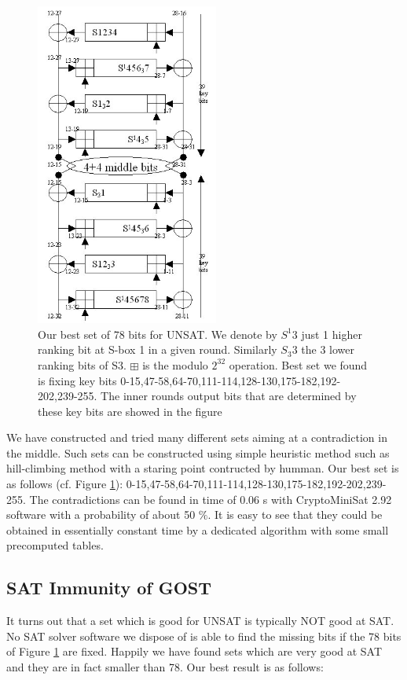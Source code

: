 \begin{figure}[h]
	\centering
	\includegraphics[width=60mm]{./pics/gost81optimal4KP.jpg}
	\caption[Our best set of 78 bits for UNSAT]{Our best set of 78 bits for UNSAT. We denote by $S^{1}3$ just 1 higher ranking bit at S-box 1 in a given round.
		Similarly $S_{3}3$ the 3 lower ranking bits of S3. $\boxplus$ is the modulo $2^{32}$ operation. Best set we found is fixing key bits 0-15,47-58,64-70,111-114,128-130,175-182,192-202,239-255. The inner rounds output bits that are determined by these key bits are showed in the figure   }
	\label{Gost81optimal4KPUNSAT78}
\end{figure}

We have constructed and tried many different sets aiming at a contradiction in the middle. Such sets can be constructed using simple heuristic method such as hill-climbing method \cite{selman2006hill} with a staring point contructed by humman. 
Our best set is as follows (cf. Figure \ref{Gost81optimal4KPUNSAT78}):
0-15,47-58,64-70,111-114,128-130,175-182,192-202,239-255.
The contradictions can be found in time of 0.06 s
with CryptoMiniSat 2.92 software \cite{CryptoMiniSat}
with a probability of about 50 $\%$.
It is easy to see that they could be obtained in essentially constant time
by a dedicated algorithm with some small precomputed tables.

\subsection{SAT Immunity of GOST}
It turns out that a set which is good for UNSAT is typically NOT good at SAT.
No SAT solver software we dispose of is able to find the missing bits if the 78 bits of Figure \ref{Gost81optimal4KPUNSAT78} are fixed.
Happily we have found sets which are very good at SAT and they are in fact smaller than 78.
Our best result is as follows:

